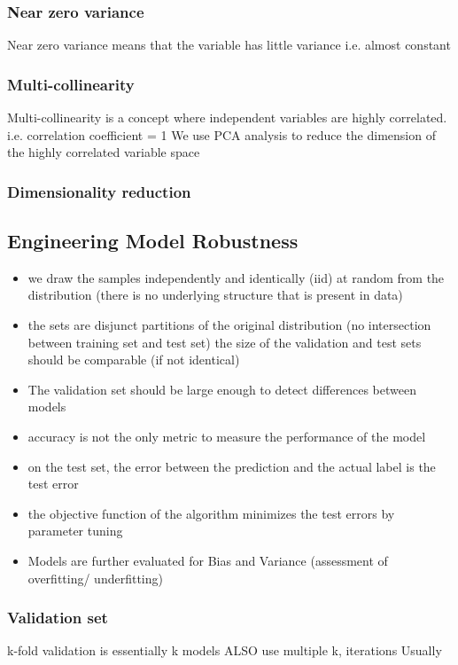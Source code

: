 \documentclass[12pt,a4paper]{article}
\begin{document}
\subsubsection{Near zero variance}
Near zero variance means that the variable has little variance i.e. almost constant
\subsubsection{Multi-collinearity}
Multi-collinearity is a concept where independent variables are highly correlated. i.e. correlation coefficient = 1
We use PCA analysis to reduce the dimension of the highly correlated variable space 
\subsubsection{Dimensionality reduction}

\subsection{Engineering Model Robustness}
\begin{itemize}
    \item we draw the samples independently and identically (iid) at random from the distribution
    (there is no underlying structure that is present in data)
    \item the sets are disjunct partitions of the original distribution
    (no intersection between training set and test set)
    the size of the validation and test sets should be comparable (if not identical)
    \item The validation set should be large enough to detect differences between models
    \item accuracy is not the only metric to measure the performance of the model
    \item  on the test set, the error between the prediction and the actual label is the test error
    \item the objective function of the algorithm minimizes the test errors by parameter tuning
    \item Models are further evaluated for Bias and Variance (assessment of overfitting/ underfitting)
\end{itemize}
\subsubsection{Validation set}
k-fold validation is essentially k models
ALSO use multiple k, iterations
Usually 
\end{document}
